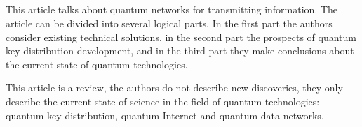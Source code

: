 \subsection{\review}
This article talks about quantum networks for transmitting information. The article can be divided into several logical parts.  In the first part the authors consider existing technical solutions, in the second part the prospects of quantum key distribution development, and in the third part they make conclusions about the current state of quantum technologies.

This article is a review, the authors do not describe new discoveries, they only describe the current state of science in the field of quantum technologies: quantum key distribution, quantum Internet and quantum data networks.


\subsection{\dic}
